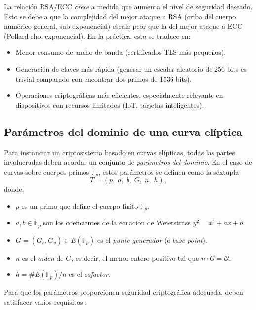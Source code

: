 La relación RSA/ECC \emph{crece} a medida que aumenta el nivel de seguridad deseado. Esto se debe a que la complejidad del mejor ataque a RSA (criba del cuerpo numérico general, sub-exponencial) escala peor que la del mejor ataque a ECC (Pollard rho, exponencial). En la práctica, esto se traduce en:

\begin{itemize}
    \item Menor consumo de ancho de banda (certificados TLS más pequeños).
    \item Generación de claves más rápida (generar un escalar aleatorio de 256 bits es trivial comparado con encontrar dos primos de 1536 bits).
    \item Operaciones criptográficas más eficientes, especialmente relevante en dispositivos con recursos limitados (IoT, tarjetas inteligentes).
\end{itemize}


\subsection{Parámetros del dominio de una curva elíptica}
\label{subsec:ecc-parametros-dominio}

Para instanciar un criptosistema basado en curvas elípticas, todas las partes involucradas deben acordar un conjunto de \emph{parámetros del dominio}. En el caso de curvas sobre cuerpos primos $\mathbb{F}_p$, estos parámetros se definen como la séxtupla
\[
    T = (p,\; a,\; b,\; G,\; n,\; h),
\]
donde:
\begin{itemize}
    \item $p$ es un primo que define el cuerpo finito $\mathbb{F}_p$.
    \item $a, b \in \mathbb{F}_p$ son los coeficientes de la ecuación de Weierstrass $y^2 = x^3 + ax + b$.
    \item $G = (G_x, G_y) \in E(\mathbb{F}_p)$ es el \emph{punto generador} (o \emph{base point}).
    \item $n$ es el \emph{orden} de $G$, es decir, el menor entero positivo tal que $n \cdot G = \mathcal{O}$.
    \item $h = \#E(\mathbb{F}_p) / n$ es el \emph{cofactor}.
\end{itemize}

Para que los parámetros proporcionen seguridad criptográfica adecuada, deben satisfacer varios requisitos \cite{sec2-v2,hankerson2004guide}:

